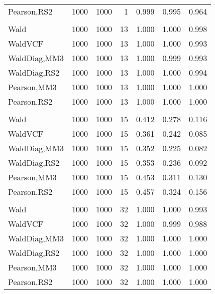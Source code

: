 \documentclass[
]{article}
\begin{document}
\begin{table}[H]
{\begin{tabular}[t]{lrrrrrr}
\hspace{1em}Pearson,RS2 & 1000 & 1000 & 1 & 0.999 & 0.995 & 0.964\\
\addlinespace[0.3em]
\multicolumn{7}{l}{\textbf{1F 15V}}\\
\hspace{1em}Wald & 1000 & 1000 & 13 & 1.000 & 1.000 & 0.998\\
\hspace{1em}WaldVCF & 1000 & 1000 & 13 & 1.000 & 1.000 & 0.993\\
\hspace{1em}WaldDiag,MM3 & 1000 & 1000 & 13 & 1.000 & 0.999 & 0.993\\
\hspace{1em}WaldDiag,RS2 & 1000 & 1000 & 13 & 1.000 & 1.000 & 0.994\\
\hspace{1em}Pearson,MM3 & 1000 & 1000 & 13 & 1.000 & 1.000 & 1.000\\
\hspace{1em}Pearson,RS2 & 1000 & 1000 & 13 & 1.000 & 1.000 & 1.000\\
\addlinespace[0.3em]
\multicolumn{7}{l}{\textbf{2F 10V}}\\
\hspace{1em}Wald & 1000 & 1000 & 15 & 0.412 & 0.278 & 0.116\\
\hspace{1em}WaldVCF & 1000 & 1000 & 15 & 0.361 & 0.242 & 0.085\\
\hspace{1em}WaldDiag,MM3 & 1000 & 1000 & 15 & 0.352 & 0.225 & 0.082\\
\hspace{1em}WaldDiag,RS2 & 1000 & 1000 & 15 & 0.353 & 0.236 & 0.092\\
\hspace{1em}Pearson,MM3 & 1000 & 1000 & 15 & 0.453 & 0.311 & 0.130\\
\hspace{1em}Pearson,RS2 & 1000 & 1000 & 15 & 0.457 & 0.324 & 0.156\\
\addlinespace[0.3em]
\multicolumn{7}{l}{\textbf{3F 15V}}\\
\hspace{1em}Wald & 1000 & 1000 & 32 & 1.000 & 1.000 & 0.993\\
\hspace{1em}WaldVCF & 1000 & 1000 & 32 & 1.000 & 0.999 & 0.988\\
\hspace{1em}WaldDiag,MM3 & 1000 & 1000 & 32 & 1.000 & 1.000 & 1.000\\
\hspace{1em}WaldDiag,RS2 & 1000 & 1000 & 32 & 1.000 & 1.000 & 1.000\\
\hspace{1em}Pearson,MM3 & 1000 & 1000 & 32 & 1.000 & 1.000 & 1.000\\
\hspace{1em}Pearson,RS2 & 1000 & 1000 & 32 & 1.000 & 1.000 & 1.000\\
\bottomrule
\end{tabular}}
\endgroup{}
\end{table}
\end{document}
